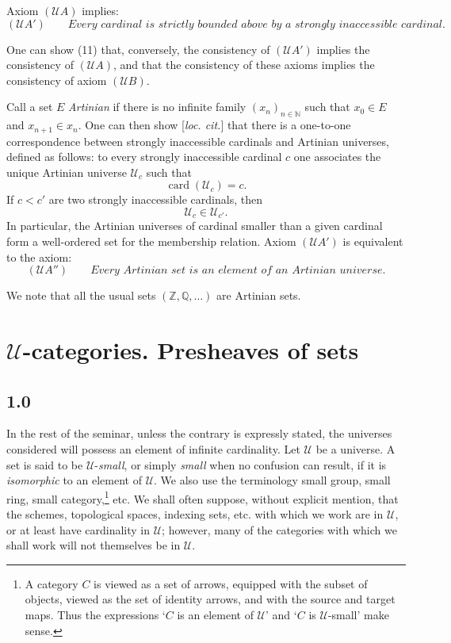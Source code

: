 \documentclass[11pt]{article}
\newcommand{\U}{\mathcal{U}}
\newcommand{\card}{\operatorname{card}}
\newcommand{\loccit}{\emph{loc. cit.}}
\theoremstyle{definition}
\begin{document}
Axiom $(\U A)$ implies:
\[(\U A')\qquad \textit{Every cardinal is strictly bounded above by a strongly inaccessible cardinal.}\]

One can show (11) that, conversely, the consistency of $(\U A')$ implies the consistency of $(\U A)$, and that the consistency of these axioms implies the consistency of axiom $(\U B)$.

Call a set $E$ \emph{Artinian} if there is no infinite family $(x_n)_{n\in\mathbb{N}}$ such that $x_0\in E$ and $x_{n+1}\in x_n$. One can then show [\loccit] that there is a one-to-one correspondence between strongly inaccessible cardinals and Artinian universes, defined as follows: to every strongly inaccessible cardinal $c$ one associates the unique Artinian universe $\U_c$ such that
\[
\card(\U_c)=c.
\]
If $c<c'$ are two strongly inaccessible cardinals, then
\[
\U_c\in \U_{c'}.
\]
In particular, the Artinian universes of cardinal smaller than a given cardinal form a well-ordered set for the membership relation. Axiom $(\U A')$ is equivalent to the axiom:
\[(\U A'')\qquad \textit{Every Artinian set is an element of an Artinian universe.}\]

We note that all the usual sets $(\mathbb{Z},\mathbb{Q},\ldots)$ are Artinian sets.

\section{$\U$-categories. Presheaves of sets}

\subsection*{1.0}

In the rest of the seminar, unless the contrary is expressly stated, the universes considered will possess an element of infinite cardinality. Let $\U$ be a universe. A set is said to be $\U$-\emph{small}, or simply \emph{small} when no confusion can result, if it is \emph{isomorphic} to an element of $\U$. We also use the terminology small group, small ring, small category,\footnote{A category $C$ is viewed as a set of arrows, equipped with the subset of objects, viewed as the set of identity arrows, and with the source and target maps. Thus the expressions `$C$ is an element of $\U$' and `$C$ is $\U$-small' make sense.} etc. We shall often suppose, without explicit mention, that the schemes, topological spaces, indexing sets, etc. with which we work are in $\U$, or at least have cardinality in $\U$; however, many of the categories with which we shall work will not themselves be in $\U$.
\end{document}
